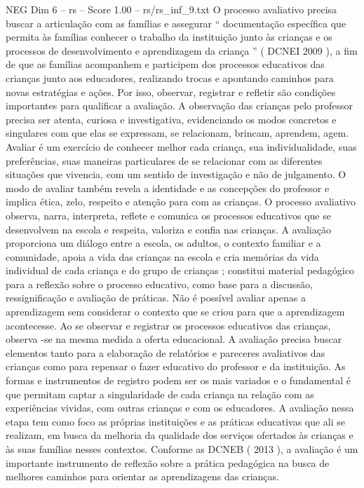 \begin{textsample}{NEG Dim 6 – rs – Score 1.00 – rs/rs\_inf\_9.txt}
O processo avaliativo precisa buscar a articulação com as famílias e assegurar “ documentação específica que permita às famílias conhecer o trabalho da instituição junto às crianças e os processos de desenvolvimento e aprendizagem da criança ” ( DCNEI 2009 ), a fim de que as famílias acompanhem e participem dos processos educativos das crianças junto aos educadores, realizando trocas e apontando caminhos para novas estratégias e ações.
Por isso, observar, registrar e refletir são condições importantes para qualificar a avaliação.
A observação das crianças pelo professor precisa ser atenta, curiosa e investigativa, evidenciando os modos concretos e singulares com que elas se expressam, se relacionam, brincam, aprendem, agem.
Avaliar é um exercício de conhecer melhor cada criança, sua individualidade, suas preferências, suas maneiras particulares de se relacionar com as diferentes situações que vivencia, com um sentido de investigação e não de julgamento.
O modo de avaliar também revela a identidade e as concepções do professor e implica ética, zelo, respeito e atenção para com as crianças.
O processo avaliativo observa, narra, interpreta, reflete e comunica os processos educativos que se desenvolvem na escola e respeita, valoriza e confia nas crianças.
A avaliação proporciona um diálogo entre a escola, os adultos, o contexto familiar e a comunidade, apoia a vida das crianças na escola e cria memórias da vida individual de cada criança e do grupo de crianças ; constitui material pedagógico para a reflexão sobre o processo educativo, como base para a discussão, ressignificação e avaliação de práticas.
Não é possível avaliar apenas a aprendizagem sem considerar o contexto que se criou para que a aprendizagem acontecesse.
Ao se observar e registrar os processos educativos das crianças, observa -se na mesma medida a oferta educacional.
A avaliação precisa buscar elementos tanto para a elaboração de relatórios e pareceres avaliativos das crianças como para repensar o fazer educativo do professor e da instituição.
As formas e instrumentos de registro podem ser os mais variados e o fundamental é que permitam captar a singularidade de cada criança na relação com as experiências vividas, com outras crianças e com os educadores.
A avaliação nessa etapa tem como foco as próprias instituições e as práticas educativas que ali se realizam, em busca da melhoria da qualidade dos serviços ofertados às crianças e às suas famílias nesses contextos.
Conforme as DCNEB ( 2013 ), a avaliação é um importante instrumento de reflexão sobre a prática pedagógica na busca de melhores caminhos para orientar as aprendizagens das crianças.

\end{textsample}
